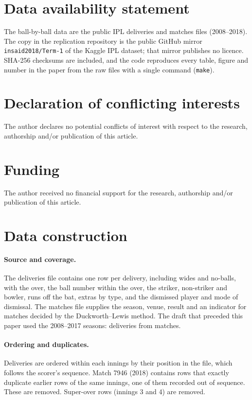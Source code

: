 \documentclass[11pt]{article}
\begin{document}
\section*{Data availability statement}
The ball-by-ball data are the public IPL deliveries and matches files (2008--2018). The copy in the replication repository is the public GitHub mirror \texttt{insaid2018/Term-1} of the Kaggle IPL dataset; that mirror publishes no licence. SHA-256 checksums are included, and the code reproduces every table, figure and number in the paper from the raw files with a single command (\texttt{make}).

\section*{Declaration of conflicting interests}
The author declares no potential conflicts of interest with respect to the research, authorship and/or publication of this article.

\section*{Funding}
The author received no financial support for the research, authorship and/or publication of this article.




\appendix
\section{Data construction}\label{app:data}

\paragraph{Source and coverage.} The deliveries file contains one row per delivery, including wides and no-balls, with the over, the ball number within the over, the striker, non-striker and bowler, runs off the bat, extras by type, and the dismissed player and mode of dismissal. The matches file supplies the season, venue, result and an indicator for matches decided by the Duckworth--Lewis method. The draft that preceded this paper used the 2008--2017 seasons: \OrigDeliveries{} deliveries from \OrigMatches{} matches.

\paragraph{Ordering and duplicates.} Deliveries are ordered within each innings by their position in the file, which follows the scorer's sequence. Match 7946 (2018) contains \DroppedDuplicates{} rows that exactly duplicate earlier rows of the same innings, one of them recorded out of sequence. These are removed. Super-over rows (innings 3 and 4) are removed.
\end{document}
